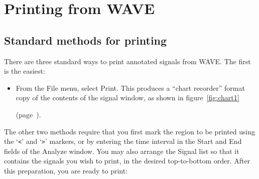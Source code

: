 \documentclass[twoside]{book}
\newcommand{\WAVE}{{\sf WAVE}\xspace}
\begin{document}
\chapter{Printing from \WAVE{}}

\label{ch:printing}
\section{Standard methods for printing}
There are three standard ways to print annotated signals from \WAVE{}.
The first is the easiest:

\begin{itemize}
\item
From the {\sf File} menu, select {\sf Print}.  This produces a ``chart
recorder'' format copy of the contents of the signal window, as shown
in figure~\ref{fig:chart1}
\begin{latexonly}
(page~\pageref{fig:chart1}).
\end{latexonly}
\end{itemize}

The other two methods require that you first mark the region to be
printed using the `{\tt <}' and `{\tt >}' markers, or by entering the
time interval in the {\sf Start} and {\sf End} fields of the {\sf
Analyze} window.  You may also arrange the {\sf Signal list} so that
it contains the signals you wish to print, in the desired top-to-bottom order.
After this preparation, you are ready to print:
\end{document}
